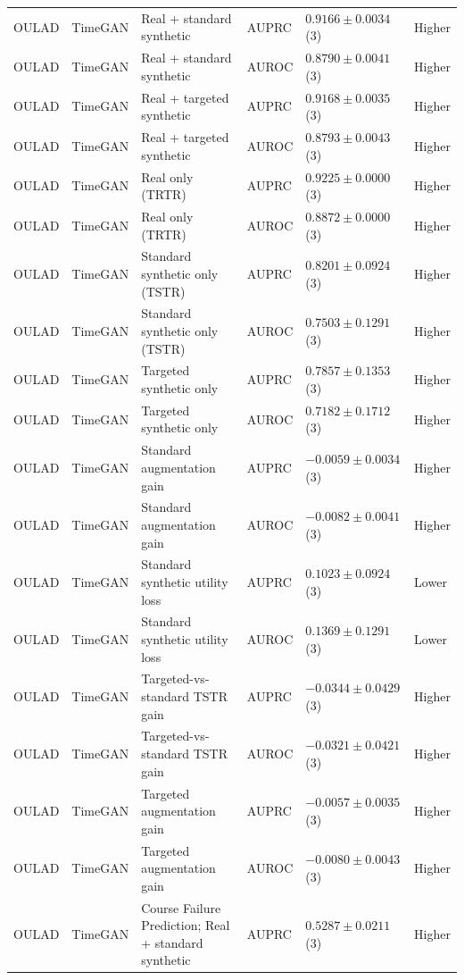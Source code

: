 \begin{longtable}{@{}p{2.25cm}p{2.05cm}p{4.7cm}p{5.0cm}p{2.6cm}p{1.25cm}@{}}
OULAD & TimeGAN & Real + standard synthetic & AUPRC & $0.9166 \mathbin{\pm} 0.0034$ (3) & Higher \\
OULAD & TimeGAN & Real + standard synthetic & AUROC & $0.8790 \mathbin{\pm} 0.0041$ (3) & Higher \\
OULAD & TimeGAN & Real + targeted synthetic & AUPRC & $0.9168 \mathbin{\pm} 0.0035$ (3) & Higher \\
OULAD & TimeGAN & Real + targeted synthetic & AUROC & $0.8793 \mathbin{\pm} 0.0043$ (3) & Higher \\
OULAD & TimeGAN & Real only (TRTR) & AUPRC & $0.9225 \mathbin{\pm} 0.0000$ (3) & Higher \\
OULAD & TimeGAN & Real only (TRTR) & AUROC & $0.8872 \mathbin{\pm} 0.0000$ (3) & Higher \\
OULAD & TimeGAN & Standard synthetic only (TSTR) & AUPRC & $0.8201 \mathbin{\pm} 0.0924$ (3) & Higher \\
OULAD & TimeGAN & Standard synthetic only (TSTR) & AUROC & $0.7503 \mathbin{\pm} 0.1291$ (3) & Higher \\
OULAD & TimeGAN & Targeted synthetic only & AUPRC & $0.7857 \mathbin{\pm} 0.1353$ (3) & Higher \\
OULAD & TimeGAN & Targeted synthetic only & AUROC & $0.7182 \mathbin{\pm} 0.1712$ (3) & Higher \\
OULAD & TimeGAN & Standard augmentation gain & AUPRC & $-0.0059 \mathbin{\pm} 0.0034$ (3) & Higher \\
OULAD & TimeGAN & Standard augmentation gain & AUROC & $-0.0082 \mathbin{\pm} 0.0041$ (3) & Higher \\
OULAD & TimeGAN & Standard synthetic utility loss & AUPRC & $0.1023 \mathbin{\pm} 0.0924$ (3) & Lower \\
OULAD & TimeGAN & Standard synthetic utility loss & AUROC & $0.1369 \mathbin{\pm} 0.1291$ (3) & Lower \\
OULAD & TimeGAN & Targeted-vs-standard TSTR gain & AUPRC & $-0.0344 \mathbin{\pm} 0.0429$ (3) & Higher \\
OULAD & TimeGAN & Targeted-vs-standard TSTR gain & AUROC & $-0.0321 \mathbin{\pm} 0.0421$ (3) & Higher \\
OULAD & TimeGAN & Targeted augmentation gain & AUPRC & $-0.0057 \mathbin{\pm} 0.0035$ (3) & Higher \\
OULAD & TimeGAN & Targeted augmentation gain & AUROC & $-0.0080 \mathbin{\pm} 0.0043$ (3) & Higher \\
OULAD & TimeGAN & Course Failure Prediction; Real + standard synthetic & AUPRC & $0.5287 \mathbin{\pm} 0.0211$ (3) & Higher \\

\end{longtable}
